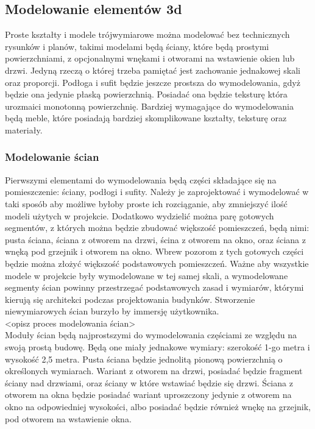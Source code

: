 \documentclass{article} %
\begin{document}
    \subsection{Modelowanie elementów 3d}
        Proste kształty i modele trójwymiarowe można modelować bez technicznych rysunków i planów, takimi modelami będą ściany, które będą prostymi powierzchniami, z opcjonalnymi wnękami i otworami na wstawienie okien lub drzwi. Jedyną rzeczą o której trzeba pamiętać jest zachowanie jednakowej skali oraz proporcji. Podłoga i sufit będzie jeszcze prostsza do wymodelowania, gdyż będzie ona jedynie płaską powierzchnią. Posiadać ona będzie teksturę która urozmaici monotonną powierzchnię.    Bardziej wymagające do wymodelowania będą meble, które posiadają bardziej skomplikowane kształty, teksturę oraz materiały. 
        \\

        \subsubsection{Modelowanie ścian}
            Pierwszymi elementami do wymodelowania będą części składające się na pomieszczenie: ściany, podłogi i sufity. Należy je zaprojektować i wymodelować w taki sposób aby możliwe byłoby proste ich rozciąganie, aby zmniejszyć ilość modeli użytych w projekcie. Dodatkowo wydzielić można parę gotowych segmentów, z których można będzie zbudować większość pomieszczeń, będą nimi: pusta ściana, ściana z otworem na drzwi, ścina z otworem na okno, oraz ściana z wnęką pod grzejnik i otworem na okno. Wbrew pozorom z tych gotowych części będzie można złożyć większość podstawowych pomieszczeń. Ważne aby wszystkie modele w projekcie były wymodelowane w tej samej skali, a wymodelowane segmenty ścian powinny przestrzegać podstawowych zasad i wymiarów, którymi kierują się architekci podczas projektowania budynków. Stworzenie niewymiarowych ścian burzyło by immersję użytkownika.
            \\
            
            <opisz proces modelowania ścian>
            \\
            
            Moduły ścian będą najprostszymi do wymodelowania częściami ze względu na swoją prostą budowę. Będą one miały jednakowe wymiary: szerokość 1-go metra i wysokość 2,5 metra. Pusta ściana będzie jednolitą pionową powierzchnią o określonych wymiarach. Wariant z otworem na drzwi, posiadać będzie fragment ściany nad drzwiami, oraz ściany w które wstawiać będzie się drzwi. Ściana z otworem na okna będzie posiadać wariant uproszczony jedynie z otworem na okno na odpowiedniej wysokości, albo posiadać będzie również wnękę na grzejnik, pod otworem na wstawienie okna.
            \\
            
\end{document}
